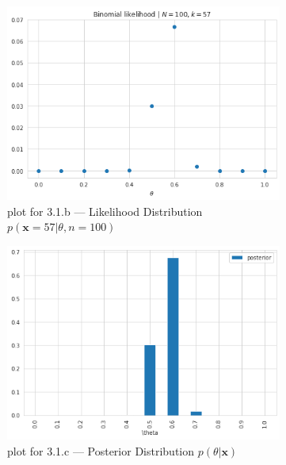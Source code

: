 \documentclass[11pt, letterpaper]{article}
\begin{document}
\begin{figure}[!b]
    \centering
    \begin{subfigure}{.49\textwidth}
        \centering
        \includegraphics[scale=0.44]{hw2_binom1.png}
        \caption{plot for 3.1.b --- Likelihood Distribution $p(\mathbf{x}=57|\theta, n=100)$}
    \end{subfigure} %
    \begin{subfigure}{.49\textwidth}
        \centering
        \includegraphics[scale=0.44]{hw2_binom_post1.png}
        \caption{plot for 3.1.c --- Posterior Distribution $p(\theta|\mathbf{x})$}
    \end{subfigure}
    \begin{subfigure}{.49\textwidth}
        \centering

\end{subfigure}
\end{figure}
\end{document}
